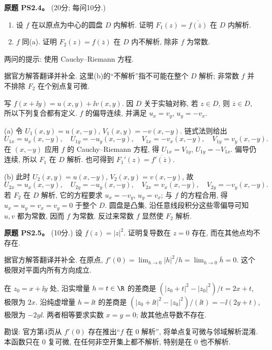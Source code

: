 \begin{exercise}\label{ass:ps2-4}
\textbf{原题 PS2.4。} (20分; 每问10分.)
\begin{enumerate}[label=(\alph*)]
\item 设 $f$ 在以原点为中心的圆盘 $D$ 内解析. 证明
$F_1(z)=\overline{f(\overline z)}$ 在 $D$ 内解析.
\item $f$ 同(a). 证明 $F_2(z)=f(\overline z)$ 在 $D$ 内不解析, 除非 $f$ 为常数.
\end{enumerate}
两问的提示: 使用 Cauchy--Riemann 方程.
\end{exercise}
\begin{solution}
据官方解答翻译并补全. 这里(b)的“不解析”指不可能在整个 $D$ 解析; 非常数 $f$ 并不排除 $F_2$ 在个别点复可微.

写 $f(x+\ii y)=u(x,y)+\ii v(x,y)$. 因 $D$ 关于实轴对称, 若 $z\in D$, 则 $\overline z\in D$, 所以下列复合都有定义. $f$ 的偏导连续, 并满足 $u_x=v_y$, $u_y=-v_x$.

(a) 令 $U_1(x,y)=u(x,-y)$, $V_1(x,y)=-v(x,-y)$.
链式法则给出
\[
 U_{1x}=u_x(x,-y),\quad U_{1y}=-u_y(x,-y),\quad
 V_{1x}=-v_x(x,-y),\quad V_{1y}=v_y(x,-y).
\]
在 $(x,-y)$ 应用 $f$ 的 Cauchy--Riemann 方程, 得
$U_{1x}=V_{1y}$, $U_{1y}=-V_{1x}$. 偏导仍连续, 所以 $F_1$ 在 $D$ 解析.
也可得到 $F_1'(z)=\overline{f'(\overline z)}$.

(b) 此时 $U_2(x,y)=u(x,-y)$, $V_2(x,y)=v(x,-y)$, 故
\[
 U_{2x}=u_x(x,-y),\quad U_{2y}=-u_y(x,-y),\quad
 V_{2x}=v_x(x,-y),\quad V_{2y}=-v_y(x,-y).
\]
若 $F_2$ 在 $D$ 解析, 它的方程要求 $u_x=-v_y$, $u_y=v_x$; 与 $f$ 的方程合用, 得 $u_x=u_y=v_x=v_y=0$ 于整个 $D$.
圆盘是凸集, 沿任意线段积分这些零偏导可知 $u,v$ 都为常数, 因而 $f$ 为常数. 反过来常数 $f$ 显然使 $F_2$ 解析.
\end{solution}

\begin{exercise}\label{ass:ps2-5}
\textbf{原题 PS2.5。} (10分.) 设 $f(z)=|z|^2$. 证明复导数在 $z=0$ 存在, 而在其他点均不存在.
\end{exercise}
\begin{solution}
据官方解答翻译并补全. 在原点,
$f'(0)=\lim_{h\to0}|h|^2/h=\lim_{h\to0}\overline h=0$.
这个极限对平面内所有方向成立.

在 $z_0=x+\ii y$ 处, 沿实增量 $h=t\in\R$ 的差商是
$(|z_0+t|^2-|z_0|^2)/t=2x+t$, 极限为 $2x$.
沿纯虚增量 $h=\ii t$ 的差商是
$(|z_0+\ii t|^2-|z_0|^2)/(\ii t)=-\ii(2y+t)$, 极限为 $-2y\ii$.
两者相等要求实数 $x=y=0$; 故其他点导数不存在.

勘误: 官方第4页从 $f'(0)$ 存在推出“$f$ 在 $0$ 解析”, 将单点复可微与邻域解析混淆. 本函数只在 $0$ 复可微, 在任何非空开集上都不解析, 特别是在 $0$ 也不解析.
\end{solution}

